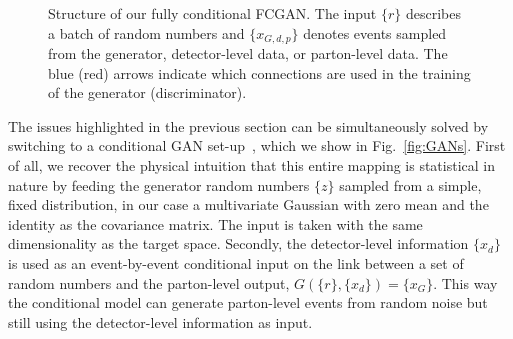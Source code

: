 \begin{figure}[t]
\centering

\caption{Structure of our fully conditional FCGAN. The
  input $\{r\}$ describes a batch of random numbers and $\{ x_{G,d,p}
  \}$ denotes events sampled from the generator, detector-level data,
  or parton-level data. The blue (red) arrows indicate which
  connections are used in the training of the generator
  (discriminator).}
\label{fig:FCGAN}
\end{figure}

The issues highlighted in the previous section can be simultaneously solved
by switching to a conditional GAN set-up~\cite{cond_gan}, which we show
 in Fig.~\ref{fig:GANs}. First of all, we recover the physical intuition that
this entire mapping is statistical in nature by feeding the generator random
numbers $\{z\}$ sampled from a simple, fixed distribution, in our case a multivariate
Gaussian with zero mean and the identity as the covariance matrix. The input
is taken with the same dimensionality as the target space.
Secondly, the detector-level information $\{ x_d \}$ is used as an event-by-event conditional input
on the link between a set of random numbers and the parton-level
output, \ie $G( \{ r \}, \{ x_d \} ) = \{ x_G \}$. This way the conditional model
can generate parton-level events from random noise but still using the
detector-level information as input. 
%
%


